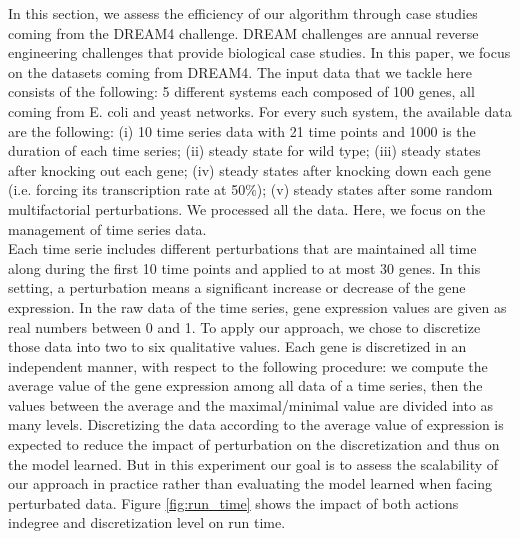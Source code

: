 	In this section, we assess the efficiency of our algorithm through case studies coming from the DREAM4 challenge.
	DREAM challenges are annual reverse engineering challenges that provide biological case studies.
	In this paper, we focus on the datasets coming from DREAM4.
	The input data that we tackle here consists of the following:
	5 different systems each composed of 100 genes, all coming from E. coli and yeast networks. For every such system,
	the available data are the following: (i) 10 time series data with 21 time points and 1000 is the duration of each time series; (ii) steady state for wild type;
	(iii) steady states after knocking out each gene;
	(iv) steady states after knocking down each gene (i.e. forcing its transcription rate at 50\%);
	(v) steady states after some random multifactorial perturbations. We processed all the data.
	Here, we focus on the management of time series data.\\
	Each time serie includes different perturbations that are maintained all time along during the first 10 time points and applied to at most 30 genes.
	In this setting, a perturbation means a significant increase or decrease of the gene expression.
	In the raw data of the time series, gene expression values are given as real numbers between 0 and 1.
	To apply our approach, we chose to discretize those data into two to six qualitative values.
	Each gene is discretized in an independent manner, with respect to the following procedure:
	we compute the average value of the gene expression among all data of a time series,
	then the values between the average and the maximal/minimal value are divided into as many levels.
	Discretizing the data according to the average value of expression is expected to reduce the impact of perturbation on the discretization and thus on the model learned.
	But in this experiment our goal is to assess the scalability of our approach in practice rather than evaluating the model learned when facing perturbated data.
	Figure \ref{fig:run_time} shows the impact of both actions indegree and discretization level on run time.


